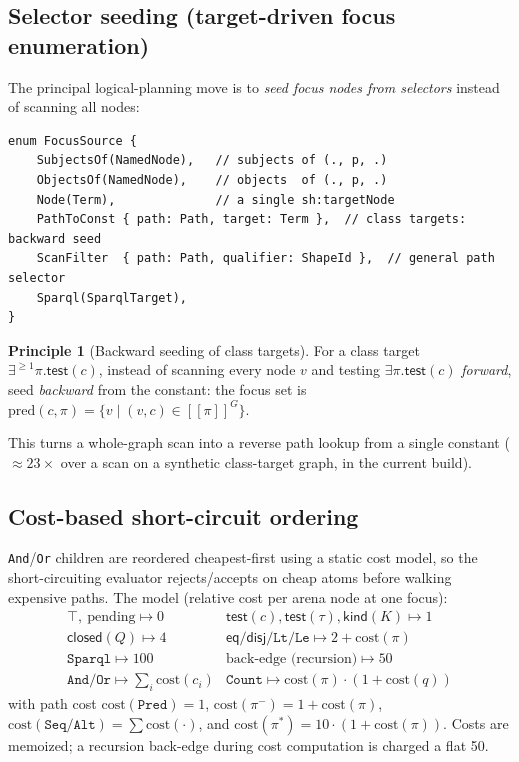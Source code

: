\documentclass[11pt]{article}
\newcommand{\sem}[1]{[\![#1]\!]}                 %
\newcommand{\semG}[1]{\sem{#1}^{G}}              %
\newcommand{\test}{\mathsf{test}}
\newcommand{\closedc}{\mathsf{closed}}
\newcommand{\eqc}{\mathsf{eq}}
\newcommand{\disjc}{\mathsf{disj}}
\newcommand{\kind}{\mathsf{kind}}
\newcommand{\Star}{{*}}
\newcommand{\code}[1]{\texttt{#1}}
\theoremstyle{definition}
\newtheorem{principle}{Principle}[section]
\begin{document}
\subsection{Selector seeding (target-driven focus enumeration)}
The principal logical-planning move is to \emph{seed focus nodes from selectors}
instead of scanning all nodes:
\begin{lstlisting}
enum FocusSource {
    SubjectsOf(NamedNode),   // subjects of (., p, .)
    ObjectsOf(NamedNode),    // objects  of (., p, .)
    Node(Term),              // a single sh:targetNode
    PathToConst { path: Path, target: Term },  // class targets: backward seed
    ScanFilter  { path: Path, qualifier: ShapeId },  // general path selector
    Sparql(SparqlTarget),
}
\end{lstlisting}
\begin{principle}[Backward seeding of class targets]
For a class target $\exists^{\geq1}\pi.\test(c)$, instead of scanning every node
$v$ and testing $\exists\pi.\test(c)$ \emph{forward}, seed \emph{backward} from
the constant: the focus set is $\mathrm{pred}(c,\pi)=\{v\mid(v,c)\in\semG{\pi}\}$.
\end{principle}
This turns a whole-graph scan into a reverse path lookup from a single constant
($\approx 23\times$ over a scan on a synthetic class-target graph, in the current
build).

\subsection{Cost-based short-circuit ordering}
\code{And}/\code{Or} children are reordered cheapest-first using a static cost
model, so the short-circuiting evaluator rejects/accepts on cheap atoms before
walking expensive paths. The model (relative cost per arena node at one focus):
\[
\begin{array}{ll}
\top,\ \text{pending} \mapsto 0 &
\test(c),\test(\tau),\kind(K)\mapsto 1\\
\closedc(Q)\mapsto 4 &
\eqc/\disjc/\code{Lt}/\code{Le}\mapsto 2+\mathrm{cost}(\pi)\\
\code{Sparql}\mapsto 100 &
\text{back-edge (recursion)}\mapsto 50\\
\code{And}/\code{Or}\mapsto \textstyle\sum_i \mathrm{cost}(c_i) &
\code{Count}\mapsto \mathrm{cost}(\pi)\cdot(1+\mathrm{cost}(q))
\end{array}
\]
with path cost $\mathrm{cost}(\code{Pred})=1$,
$\mathrm{cost}(\pi^{-})=1+\mathrm{cost}(\pi)$,
$\mathrm{cost}(\code{Seq}/\code{Alt})=\sum\mathrm{cost}(\cdot)$, and
$\mathrm{cost}(\pi^{\Star})=10\cdot(1+\mathrm{cost}(\pi))$. Costs are memoized;
a recursion back-edge during cost computation is charged a flat 50.
\end{document}
